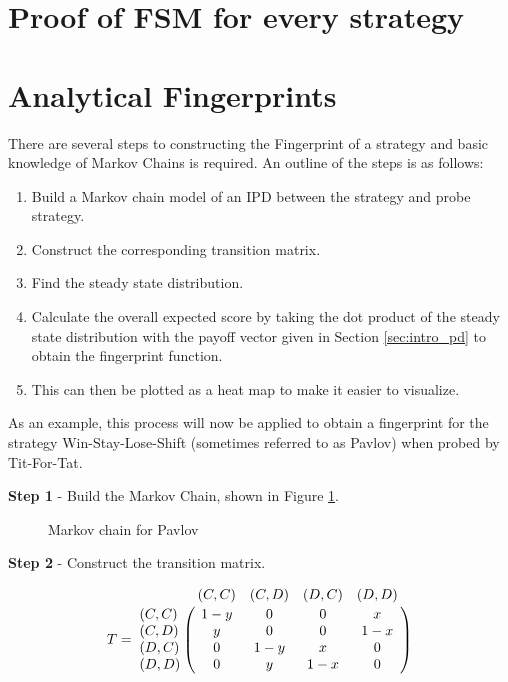 \section{Proof of FSM for every strategy}\label{sec:fsm_proof}



\section{Analytical Fingerprints}\label{sec:analytical-fingerprints}


There are several steps to constructing the Fingerprint of a strategy and basic knowledge of Markov Chains is required.
An outline of the steps is as follows:

\begin{enumerate}
    \item Build a Markov chain model of an IPD between the strategy and probe strategy.
    \item Construct the corresponding transition matrix.
    \item Find the steady state distribution.
    \item Calculate the overall expected score by taking the dot product of the steady state distribution with the payoff vector given in Section \ref{sec:intro_pd} to obtain the fingerprint function.
    \item This can then be plotted as a heat map to make it easier to visualize.
\end{enumerate}

As an example, this process will now be applied to obtain a fingerprint for the strategy Win-Stay-Lose-Shift (sometimes referred to as Pavlov) when probed by Tit-For-Tat.

\textbf{Step 1} - Build the Markov Chain, shown in Figure \ref{fig:PavlovMC}.

\begin{figure}[ht!]
\centering

\caption{Markov chain for Pavlov}
\label{fig:PavlovMC}
\end{figure}

\textbf{Step 2} - Construct the transition matrix.

\begin{equation}\label{eq:transition_matrix}
%
T = \bordermatrix{~      & (C, C) & (C, D) & (D, C) & (D, D) \cr
                  (C, C) & 1 - y  & 0      & 0      & x      \cr
                  (C, D) & y      & 0      & 0      & 1 - x  \cr
                  (D, C) & 0      & 1 - y  & x      & 0      \cr
                  (D, D) & 0      & y      & 1 - x  & 0}
%
\end{equation}

